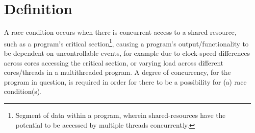\section{Definition}
A race condition occurs when there is concurrent access to a shared resource, such as a program's critical section\footnote{Segment of data within a program, wherein shared-resources have the potential to be accessed by multiple threads concurrently.}, causing a program's output/functionality to be dependent on uncontrollable events, for example due to clock-speed differences across cores accessing the critical section, or varying load across different cores/threads in a multithreaded program. A degree of concurrency, for the program in question, is required in order for there to be a possibility for (a) race condition(s).
